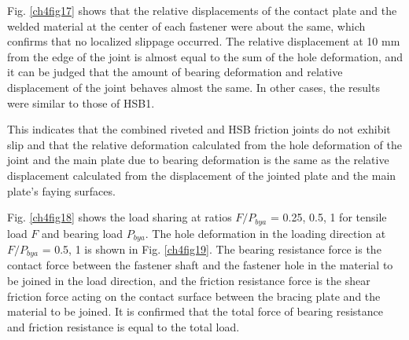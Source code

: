 Fig. \ref{ch4fig17} shows that the relative displacements of the contact plate and the welded material at the center of each fastener were about the same, which confirms that no localized slippage occurred. The relative displacement at 10 mm from the edge of the joint is almost equal to the sum of the hole deformation, and it can be judged that the amount of bearing deformation and relative displacement of the joint behaves almost the same. In other cases, the results were similar to those of HSB1.

This indicates that the combined riveted and HSB friction joints do not exhibit slip and that the relative deformation calculated from the hole deformation of the joint and the main plate due to bearing deformation is the same as the relative displacement calculated from the displacement of the jointed plate and the main plate's faying surfaces. 

Fig. \ref{ch4fig18} shows the load sharing at ratios $F / P_{bya}$ = 0.25, 0.5, 1 for tensile load $F$ and bearing load $P_{bya}$. The hole deformation in the loading direction at $F / P_{bya}$ = 0.5, 1 is shown in Fig. \ref{ch4fig19}. The bearing resistance force is the contact force between the fastener shaft and the fastener hole in the material to be joined in the load direction, and the friction resistance force is the shear friction force acting on the contact surface between the bracing plate and the material to be joined. It is confirmed that the total force of bearing resistance and friction resistance is equal to the total load.

